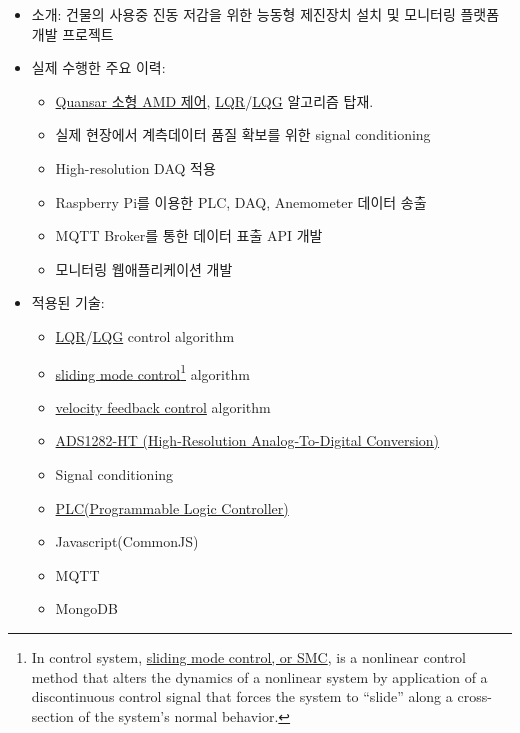 \documentclass[10pt,a4paper,ragged2e]{altacv}
\begin{document}
\begin{fullwidth}
\begin{itemize}
\item 소개: 건물의 사용중 진동 저감을 위한 능동형 제진장치 설치 및 모니터링 플랫폼 개발 프로젝트
\item 실제 수행한 주요 이력:
  \begin{itemize}
    \item \href{http://www.quanser.com/products/active_mass_damper}{Quansar 소형 AMD 제어}, \href{https://en.wikipedia.org/wiki/Linear-quadratic_regulator}{LQR}/\href{https://en.wikipedia.org/wiki/Linear-quadratic-Gaussian_control}{LQG} 알고리즘 탑재.
    \item 실제 현장에서 계측데이터 품질 확보를 위한 signal conditioning
    \item High-resolution DAQ 적용
    \item Raspberry Pi를 이용한 PLC, DAQ, Anemometer 데이터 송출
    \item MQTT Broker를 통한 데이터 표출 API 개발
    \item 모니터링 웹애플리케이션 개발
  \end{itemize}
\item
 적용된 기술:
   \begin{itemize}
    \item \href{https://en.wikipedia.org/wiki/Linear-quadratic_regulator}{LQR}/\href{https://en.wikipedia.org/wiki/Linear-quadratic-Gaussian_control}{LQG} control algorithm
    \item \href{https://en.wikipedia.org/wiki/Sliding_mode_control}{sliding mode control}\footnote{In control system,  \href{https://en.wikipedia.org/wiki/Sliding_mode_control}{sliding mode control, or SMC}, is a nonlinear control method that alters the dynamics of a nonlinear system by application of a discontinuous control signal that forces the system to ``slide'' along a cross-section of the system's normal behavior.} algorithm 
    \item \href{https://en.wikipedia.org/wiki/Minor_loop_feedback}{velocity feedback control} algorithm
    \item \href{http://www.ti.com/lit/ds/symlink/ads1282-ht.pdf}{ADS1282-HT (High-Resolution Analog-To-Digital Conversion)}
    \item Signal conditioning
    \item \href{https://en.wikipedia.org/wiki/Programmable_logic_controller}{PLC(Programmable Logic Controller)}
    \item Javascript(CommonJS)
    \item MQTT
    \item MongoDB

\end{itemize}
\end{itemize}
\end{fullwidth}
\end{document}
